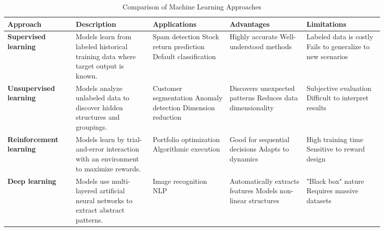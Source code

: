 \begin{table}[!htbp]
\centering
\caption{Comparison of Machine Learning Approaches}
\label{tab:ml_approaches}
\begin{tabular}{p{0.16\linewidth} | p{0.18\linewidth} | p{0.18\linewidth} | p{0.18\linewidth} | p{0.18\linewidth}}
	\toprule
	\textbf{Approach} & \textbf{Description} & \textbf{Applications} & \textbf{Advantages} & \textbf{Limitations} \\
	\midrule
	\textbf{Supervised learning} & Models learn from labeled historical training data where target output is known. & Spam detection \newline Stock return prediction \newline Default classification & Highly accurate \newline Well-understood methods & Labeled data is costly \newline Fails to generalize to new scenarios \\
	\midrule
	\textbf{Unsupervised learning} & Models analyze unlabeled data to discover hidden structures and groupings. & Customer segmentation \newline Anomaly detection \newline Dimension reduction & Discovers unexpected patterns \newline Reduces data dimensionality & Subjective evaluation \newline Difficult to interpret results \\
	\midrule
	\textbf{Reinforcement learning} & Models learn by trial-and-error interaction with an environment to maximize rewards. & Portfolio optimization \newline Algorithmic execution & Good for sequential decisions \newline Adapts to dynamics & High training time \newline Sensitive to reward design \\
	\midrule
	\textbf{Deep learning} & Models use multi-layered artificial neural networks to extract abstract patterns. & Image recognition \newline NLP & Automatically extracts features \newline Models non-linear structures & "Black box" nature \newline Requires massive datasets \\
	\bottomrule
\end{tabular}
\end{table}

